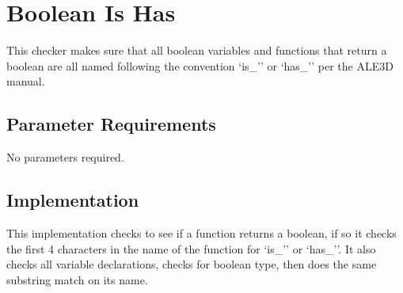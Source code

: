 %
%

\section{Boolean Is Has}
\label{BooleanIsHas::overview}

   This checker makes sure that all boolean variables and functions
   that return a boolean are all named following the convention `is\_'' or
   `has\_'' per the ALE3D manual.    

\subsection{Parameter Requirements}

   No parameters required.

\subsection{Implementation}

   This implementation checks to see if a function returns
    a boolean, if so it checks the first 4 characters in the
    name of the function for `is\_'' or `has\_''.  It also checks all
    variable declarations, checks for boolean type, then does the same
    substring match on its name.

